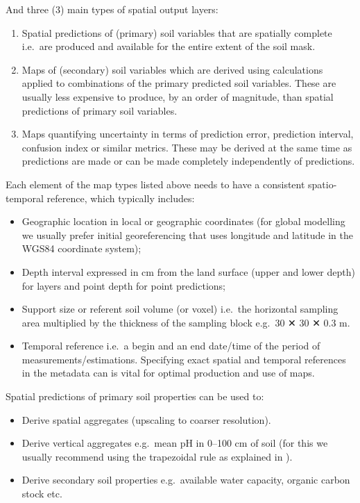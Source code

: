 \documentclass[graybox,natbib,nospthms,UStrade]{svmono}
\begin{document}
And three (3) main types of spatial output layers:

\begin{enumerate}
\def\labelenumi{\arabic{enumi}.}
\setcounter{enumi}{3}
\item
  Spatial predictions of (primary) soil variables that are spatially
  complete i.e.~are produced and available for the entire extent of
  the soil mask.
\item
  Maps of (secondary) soil variables which are derived using
  calculations applied to combinations of the primary predicted
  soil variables. These are usually less expensive to produce, by an
  order of magnitude, than spatial predictions of primary
  soil variables.
\item
  Maps quantifying uncertainty in terms of prediction error,
  prediction interval, confusion index or similar metrics. These may
  be derived at the same time as predictions are made or can be made
  completely independently of predictions.
\end{enumerate}

Each element of the map types listed above needs to have a consistent
spatio-temporal reference, which typically includes:

\begin{itemize}
\item
  Geographic location in local or geographic coordinates (for global
  modelling we usually prefer initial georeferencing that uses
  longitude and latitude in the WGS84 coordinate system);
\item
  Depth interval expressed in cm from the land surface (upper and
  lower depth) for layers and point depth for point predictions;
\item
  Support size or referent soil volume (or voxel) i.e.~the horizontal
  sampling area multiplied by the thickness of the sampling
  block e.g.~30 ✕ 30 ✕ 0.3 m.
\item
  Temporal reference i.e.~a begin and an end date/time of the period
  of measurements/estimations. Specifying exact spatial and temporal
  references in the metadata can is vital for optimal production and
  use of maps.
\end{itemize}

Spatial predictions of primary soil properties can be used to:

\begin{itemize}
\item
  Derive spatial aggregates (upscaling to coarser resolution).
\item
  Derive vertical aggregates e.g.~mean pH in 0--100 cm of soil (for
  this we usually recommend using the trapezoidal rule as explained in \citet{Hengl2017SoilGrids250m}).
\item
  Derive secondary soil properties e.g.~available water capacity,
  organic carbon stock etc.
\end{itemize}
\end{document}
